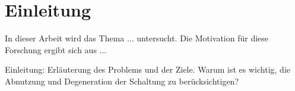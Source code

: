 \chapter{Einleitung}
In dieser Arbeit wird das Thema ... untersucht. Die Motivation für diese Forschung ergibt sich aus ... 

Einleitung: Erläuterung des Problems und der Ziele. Warum ist es wichtig, die Abnutzung und Degeneration der Schaltung zu berücksichtigen?
